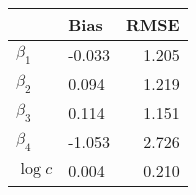 
\begin{tabular}[t]{llr}
\toprule
  & Bias & RMSE\\
\midrule
$\beta_{1}$ & -0.033 & 1.205\\
$\beta_{2}$ & 0.094 & 1.219\\
$\beta_{3}$ & 0.114 & 1.151\\
$\beta_{4}$ & -1.053 & 2.726\\
$\log c$ & 0.004 & 0.210\\
\bottomrule
\end{tabular}
